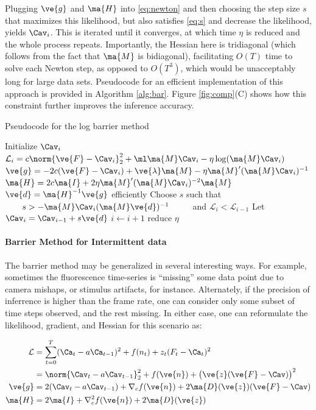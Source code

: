 \documentclass[12pt]{article}
\begin{document}
Plugging $\ve{g}$ and $\ma{H}$ into \eqref{eq:newton} and then choosing the step size $s$ that maximizes this likelihood, but also satisfies \eqref{eq:s} and decrease the likelihood, yields $\Cav_i$. This is iterated until it converges, at which time $\eta$ is reduced and the whole process repeats. Importantly,  the Hessian here is tridiagonal (which follows from the fact that $\ma{M}$ is bidiagonal), facilitating $O(T)$ time to solve each Newton step, as opposed to $O(T^3)$, which would be unacceptably long for large data sets.  Pseudocode for an efficient implementation of this approach is provided in Algorithm \ref{alg:bar}.  Figure \ref{fig:comp}(C) shows how this constraint further improves the inference accuracy.

\begin{algorithm}
\caption{Pseudocode for the log barrier method} \label{alg:bar}
\begin{algorithmic}
\WHILE{$\eta > \epsilon$}
\STATE Initialize $\Cav_{i}$
\STATE $\mathcal{L}_i =c \norm{\ve{F}-\Cav_i}_2^2 +\ml \ma{M}\Cav_i - \eta \log (\ma{M}\Cav_i)$
\STATE $\ve{g}=-2c (\ve{F}-\Cav_i)+\ve{\lambda}\ma{M} - \eta \ma{M}' (\ma{M}\Cav_i)^{-1}$
\STATE $\ma{H}=2c \ma{I} + 2 \eta \ma{M}' (\ma{M}\Cav_i)^{-2}\ma{M}$
\STATE $\ve{d}=\ma{H}^{-1}\ve{g}$ efficiently
\STATE Choose $s$ such that 
\STATE $\qquad s > -\ma{M}\Cav_i (\ma{M} \ve{d})^{-1}$
\STATE $\qquad$ and $\mathcal{L}_{i} < \mathcal{L}_{i-1}$
\STATE Let $\Cav_i = \Cav_{i-1} + s \ve{d}$
\STATE $i \leftarrow i + 1$
\ENDWHILE
\STATE reduce $\eta$ 
\ENDWHILE
\end{algorithmic}
\end{algorithm}

\paragraph{Barrier Method for Intermittent data}

The barrier method may be generalized in several interesting ways.  For example, sometimes the fluorescence time-series is ``missing'' some data point due to camera mishaps, or stimulus artifacts,  for instance.  Alternately, if the precision of inferrence is higher than the frame rate, one can consider only some subset of time steps observed, and the rest missing.  In either case, one can reformulate the likelihood, gradient, and Hessian for this scenario as:

\begin{align}
\mathcal{L}&= \sum_{t=0}^T (\Ca_t - a \Ca_{t-1})^2 + f(n_t) + z_t (F_t-\Ca_t)^2 \nonumber \\
&=\norm{\Cav_t - a \Cav_{t-1}}_2^2 + f(\ve{n}) + \big(\ve{z}(\ve{F}-\Cav)\big)^2\\
\ve{g}&=2(\Cav_t - a \Cav_{t-1}) + \nabla_c f(\ve{n}) + 2 \ma{D}(\ve{z})(\ve{F}-\Cav)\\
\ma{H}&=2\ma{I} + \nabla_c^2 f(\ve{n}) + 2 \ma{D}(\ve{z})
\end{align}
\end{document}
